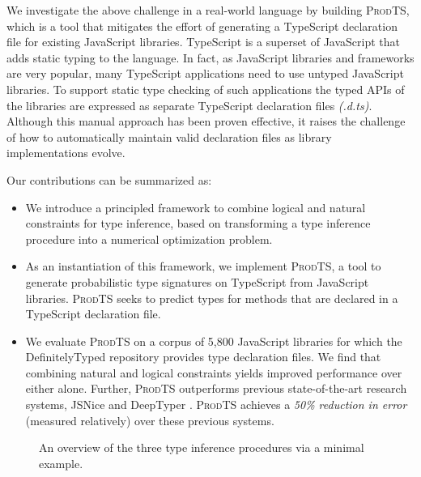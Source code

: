 \documentclass[sigplan,10pt,anonymous]{acmart} %
\newcommand{\prodts}{\textsc{ProdTS}\xspace}
\theoremstyle{plain}
\theoremstyle{remark}
\theoremstyle{definition}
\begin{document}
We investigate the above challenge in a real-world language by building \prodts,
which is a tool that mitigates the effort of generating a
TypeScript declaration file for existing JavaScript libraries.
TypeScript is a superset of JavaScript that adds static typing to the language.
In fact, as JavaScript libraries and frameworks are very popular, many
TypeScript applications need to use untyped JavaScript libraries.
To support static type
checking of such applications the typed
APIs of the libraries are expressed as separate TypeScript
declaration files \emph{(.d.ts)}.  Although this manual approach has been proven
effective, it raises the challenge of how to automatically maintain valid declaration files
as library implementations evolve.

Our contributions can be summarized as:
\begin{itemize}[label=\raisebox{0.25ex}{\tiny$\bullet$}]
  \item We introduce a principled framework to combine logical and natural constraints for type inference,
        based on transforming a type inference procedure into a numerical optimization problem.
  \item As an instantiation of this framework, we implement \prodts, a tool to generate probabilistic type
        signatures on TypeScript from JavaScript libraries.
        \prodts seeks to predict types for methods that are declared in a TypeScript declaration file.
  \item We evaluate \prodts on a corpus of 5,800 JavaScript libraries for which
        the DefinitelyTyped repository provides type declaration files.
        We find that combining natural and logical constraints
        yields improved performance over either alone.
        Further, \prodts outperforms previous state-of-the-art research systems,
        JSNice \cite{raychev15} and DeepTyper \cite{hellendoorn18}.
        \prodts achieves a \emph{50\% reduction in error} (measured relatively) over these previous systems.
\end{itemize}

\begin{figure*}
  \centering
  \def\svgwidth{0.85\linewidth}
  
  \caption{An overview of the three type inference procedures via a minimal example.}\label{fig:fullexample}
\end{figure*}
\end{document}
